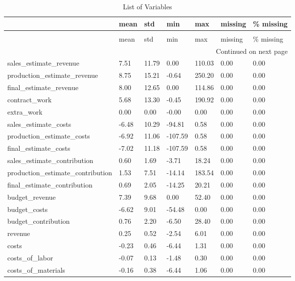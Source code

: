\begin{landscape}\begin{longtable}[h!]{lllllll}
\caption{List of Variables} \label{eda_1} \\
\toprule
 & mean & std & min & max & missing & \% missing \\
\midrule
\endfirsthead
\caption[]{List of Variables} \\
\toprule
 & mean & std & min & max & missing & \% missing \\
\midrule
\endhead
\midrule
\multicolumn{7}{r}{Continued on next page} \\
\midrule
\endfoot
\bottomrule
\endlastfoot
sales_estimate_revenue & 7.51 & 11.79 & 0.00 & 110.03 & 0.00 & 0.00 \\
production_estimate_revenue & 8.75 & 15.21 & -0.64 & 250.20 & 0.00 & 0.00 \\
final_estimate_revenue & 8.00 & 12.65 & 0.00 & 114.86 & 0.00 & 0.00 \\
contract_work & 5.68 & 13.30 & -0.45 & 190.92 & 0.00 & 0.00 \\
extra_work & 0.00 & 0.00 & -0.00 & 0.00 & 0.00 & 0.00 \\
sales_estimate_costs & -6.48 & 10.29 & -94.81 & 0.58 & 0.00 & 0.00 \\
production_estimate_costs & -6.92 & 11.06 & -107.59 & 0.58 & 0.00 & 0.00 \\
final_estimate_costs & -7.02 & 11.18 & -107.59 & 0.58 & 0.00 & 0.00 \\
sales_estimate_contribution & 0.60 & 1.69 & -3.71 & 18.24 & 0.00 & 0.00 \\
production_estimate_contribution & 1.53 & 7.51 & -14.14 & 183.54 & 0.00 & 0.00 \\
final_estimate_contribution & 0.69 & 2.05 & -14.25 & 20.21 & 0.00 & 0.00 \\
budget_revenue & 7.39 & 9.68 & 0.00 & 52.40 & 0.00 & 0.00 \\
budget_costs & -6.62 & 9.01 & -54.48 & 0.00 & 0.00 & 0.00 \\
budget_contribution & 0.76 & 2.20 & -6.50 & 28.40 & 0.00 & 0.00 \\
revenue & 0.25 & 0.52 & -2.54 & 6.01 & 0.00 & 0.00 \\
costs & -0.23 & 0.46 & -6.44 & 1.31 & 0.00 & 0.00 \\
costs_of_labor & -0.07 & 0.13 & -1.48 & 0.30 & 0.00 & 0.00 \\
costs_of_materials & -0.16 & 0.38 & -6.44 & 1.06 & 0.00 & 0.00 \\

\end{longtable}
\end{landscape}

